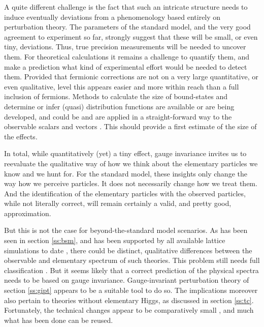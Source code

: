 \documentclass[final,12pt]{article}
\newcommand*{\1}{1\!\!\!\bot}
\begin{document}
A quite different challenge is the fact that such an intricate structure needs to induce eventually deviations from a phenomenology based entirely on perturbation theory. The parameters of the standard model, and the very good agreement to experiment so far, strongly suggest that these will be small, or even tiny, deviations. Thus, true precision measurements will be needed to uncover them. For theoretical calculations it remains a challenge to quantify them, and make a prediction what kind of experimental effort would be needed to detect them. Provided that fermionic corrections are not on a very large quantitative, or even qualitative, level this appears easier and more within reach than a full inclusion of fermions. Methods to calculate the size of bound-states \cite{Koponen:2015tkr,Gockeler:2003ay} and determine or infer (quasi) distribution functions \cite{Nguyen:2011jy,Lin:2014zya,Chen:2016utp,Nocera:2017war,Lin:2017snn,Gao:2017yyd} are available or are being developed, and could be and are applied in a straight-forward way to the observable scalars and vectors \cite{Egger:2017tkd,Raubitzek:unpublished,Fernbach:unpublished}. This should provide a first estimate of the size of the effects.

In total, while quantitatively (yet) a tiny effect, gauge invariance invites us to reevaluate the qualitative way of how we think about the elementary particles we know and we hunt for. For the standard model, these insights only change the way how we perceive particles. It does not necessarily change how we treat them. And the identification of the elementary particles with the observed particles, while not literally correct, will remain certainly a valid, and pretty good, approximation.

But this is not the case for beyond-the-standard model scenarios. As has been seen in section \ref{ss:bsm}, and has been supported by all available lattice simulations to date \cite{Maas:2016ngo,Lee:1985yi,Maas:unpublishedtoerek}, there could be distinct, qualitative differences between the observable and elementary spectrum of such theories. This problem still needs full classification \cite{Maas:2017xzh}. But it seems likely that a correct prediction of the physical spectra needs to be based on gauge invariance. Gauge-invariant perturbation theory of section \ref{ss:gipt} appears to be a suitable tool to do so. The implications moreover also pertain to theories without elementary Higgs, as discussed in section \ref{ss:tc}. Fortunately, the technical changes appear to be comparatively small \cite{Maas:2017xzh}, and much what has been done can be reused.
\end{document}
